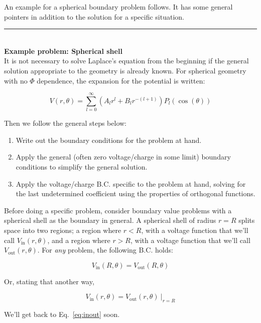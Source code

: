 \documentclass[12pt]{article}
\begin{document}
\begin{flushleft}
An example for a spherical boundary problem follows.  It has some general pointers in addition to the solution for a specific situation.

 \vspace{.2in}
{\color{grey} \rule{\linewidth}{0.7mm} }\\
\vspace{-.2in}
{\textbf{\color{mygreen} Example problem: Spherical shell}}\\
\vspace{.1in}
It is not necessary to solve Laplace's equation from the beginning if the general solution appropriate to the geometry is already known.  For spherical geometry with no $\Phi$ dependence, the expansion for the potential is written:

\begin{equation*}
 V(r,\theta) = \sum_{l=0}^{\infty} \left(  A_{l}r^{l} + B_{l}r^{-(l+1)} \right) P_{l}(\cos{(\theta)})
\end{equation*}

Then we follow the general steps below:
\begin{enumerate} 
\item Write out the boundary conditions for the problem at hand. 
\item Apply the general (often zero voltage/charge in some limit) boundary conditions to simplify the general solution.
\item Apply the voltage/charge B.C. specific to the problem at hand, solving for the last undetermined coefficient using the properties of orthogonal functions.
\end{enumerate}

Before doing a specific problem, consider boundary value problems with a spherical shell as the boundary in general.  A spherical shell of radius $r=R$ splits space into two regions; a region where $r<R$, with a voltage function that we'll call $V_{\text{in}}(r,\theta)$, and a region where $r>R$, with a voltage function that we'll call $V_{\text{out}}(r,\theta)$.  For \textit{any} problem, the following B.C. holds:

\begin{equation}
V_{\text{in}}(R,\theta) = V_{\text{out}}(R,\theta)
\label{eq:inout}
\end{equation}

Or, stating that another way,

\[
\left. V_{\text{in}}(r,\theta) = V_{\text{out}}(r,\theta) \: \right|_{r=R}
\]

We'll get back to Eq.~\ref{eq:inout} soon.


\end{flushleft}
\end{document}
